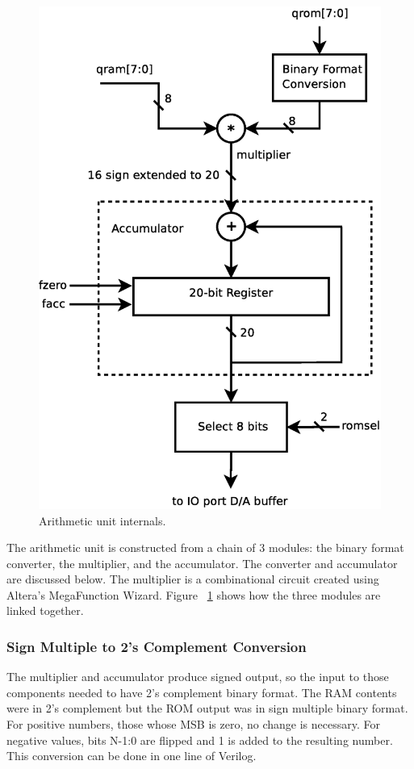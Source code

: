 \documentclass[12pt]{article}
\begin{document}
	\begin{figure}[ht]
	\centering
	\includegraphics[scale=0.40]{math.eps}
	\caption{Arithmetic unit internals.}
	\label{fig:math}
	\end{figure}

	The arithmetic unit is constructed from a chain of 3 modules: the binary format converter,
	the multiplier, and the accumulator.  The converter and accumulator are discussed below.
	The multiplier is a combinational circuit created using Altera's MegaFunction Wizard.  Figure
	~\ref{fig:math} shows how the three modules are linked together.

		\subsubsection{Sign Multiple to 2's Complement Conversion}
		The multiplier and accumulator produce signed output, so the input to
		those components needed to have 2's complement binary format.  The RAM
		contents were in 2's complement but the ROM output was in sign multiple
		binary format.  For positive numbers, those whose MSB is zero,
		no change is necessary.  For negative values, bits N-1:0 are flipped
		and 1 is added to the resulting number.  This conversion can be done in
		one line of Verilog.
\end{document}
